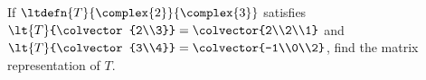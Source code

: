If $\ltdefn{T}{\complex{2}}{\complex{3}}$ satisfies 
$\lt{T}{\colvector{2\\3}} = \colvector{2\\2\\1}$ 
and 
$\lt{T}{\colvector{3\\4}} = \colvector{-1\\0\\2}$, 
find the matrix representation of $T$.